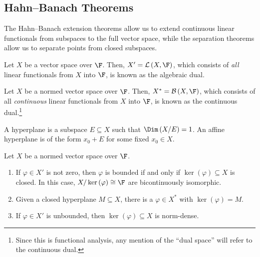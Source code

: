 \documentclass[10pt]{mypackage}
\begin{document}
  \subsection{Hahn--Banach Theorems}%
  The Hahn--Banach extension theorems allow us to extend continuous linear functionals from subspaces to the full vector space, while the separation theorems allow us to separate points from closed subspaces.
  \begin{definition}
    Let $X$ be a vector space over $\F$. Then, $X' = \mathcal{L}\left(X,\F\right)$, which consists of \textit{all} linear functionals from $X$ into $\F$, is known as the algebraic dual.
  \end{definition}
  \begin{definition}
    Let $X$ be a normed vector space over $\F$. Then, $X^{\ast} = \mathcal{B}\left(X,\F\right)$, which consists of all \textit{continuous} linear functionals from $X$ into $\F$, is known as the continuous dual.\footnote{Since this is functional analysis, any mention of the ``dual space'' will refer to the continuous dual.}
  \end{definition}
  \begin{definition}[Hyperplane]
    A hyperplane is a subspace $E\subseteq X$ such that $\Dim\left(X/E\right) = 1$. An affine hyperplane is of the form $x_0 + E$ for some fixed $x_0\in X$.
  \end{definition}
  \begin{proposition}
    Let $X$ be a normed vector space over $\F$.
    \begin{enumerate}[(1)]
      \item If $\varphi\in X'$ is not zero, then $\varphi$ is bounded if and only if $\ker\left(\varphi\right) \subseteq X$ is closed. In this case, $X/\ker\left(\varphi\right) \cong \F$ are bicontinuously isomorphic.
      \item Given a closed hyperplane $M\subseteq X$, there is a $\varphi\in X^{\ast}$ with $\ker\left(\varphi\right) = M$.
      \item If $\varphi\in X'$ is unbounded, then $\ker\left(\varphi\right)\subseteq X$ is norm-dense.
    \end{enumerate}
  \end{proposition}
\end{document}
